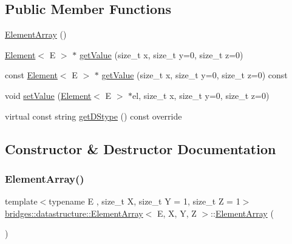 \subsection*{Public Member Functions}
\begin{DoxyCompactItemize}
\item 
\mbox{\hyperlink{classbridges_1_1datastructure_1_1_element_array_ae86caf35a947e3b34a2d2bd421e414eb}{Element\+Array}} ()
\item 
\mbox{\hyperlink{classbridges_1_1datastructure_1_1_element}{Element}}$<$ E $>$ $\ast$ \mbox{\hyperlink{classbridges_1_1datastructure_1_1_element_array_a383d08e16eeeb06217d030ed2b18fb37}{get\+Value}} (size\+\_\+t x, size\+\_\+t y=0, size\+\_\+t z=0)
\item 
const \mbox{\hyperlink{classbridges_1_1datastructure_1_1_element}{Element}}$<$ E $>$ $\ast$ \mbox{\hyperlink{classbridges_1_1datastructure_1_1_element_array_a1b05a90e5611a83a4a0c2b535d134303}{get\+Value}} (size\+\_\+t x, size\+\_\+t y=0, size\+\_\+t z=0) const
\item 
void \mbox{\hyperlink{classbridges_1_1datastructure_1_1_element_array_aecd1e6ae5a15c74837f2bfe9d7fbeb60}{set\+Value}} (\mbox{\hyperlink{classbridges_1_1datastructure_1_1_element}{Element}}$<$ E $>$ $\ast$el, size\+\_\+t x, size\+\_\+t y=0, size\+\_\+t z=0)
\item 
virtual const string \mbox{\hyperlink{classbridges_1_1datastructure_1_1_element_array_a22d8c37e88616105cdb7c755f99fdb20}{get\+D\+Stype}} () const override
\end{DoxyCompactItemize}


\subsection{Constructor \& Destructor Documentation}
\mbox{\label{classbridges_1_1datastructure_1_1_element_array_ae86caf35a947e3b34a2d2bd421e414eb}} 
\subsubsection{\texorpdfstring{ElementArray()}{ElementArray()}}
{\footnotesize\ttfamily template$<$typename E , size\+\_\+t X, size\+\_\+t Y = 1, size\+\_\+t Z = 1$>$ \\
\mbox{\hyperlink{classbridges_1_1datastructure_1_1_element_array}{bridges\+::datastructure\+::\+Element\+Array}}$<$ E, X, Y, Z $>$\+::\mbox{\hyperlink{classbridges_1_1datastructure_1_1_element_array}{Element\+Array}} (\begin{DoxyParamCaption}{ }\end{DoxyParamCaption})\hspace{0.3cm}{\ttfamily [inline]}}



